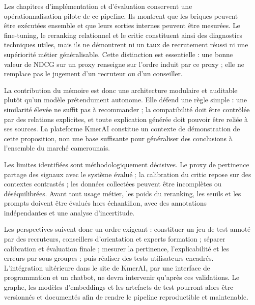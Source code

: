 \documentclass[12pt,twoside]{report}
\begin{document}
Les chapitres d'implémentation et d'évaluation conservent une opérationnalisation pilote de ce pipeline. Ils montrent que les briques peuvent être exécutées ensemble et que leurs sorties internes peuvent être mesurées. Le fine-tuning, le reranking relationnel et le critic constituent ainsi des diagnostics techniques utiles, mais ils ne démontrent ni un taux de recrutement réussi ni une supériorité métier généralisable. Cette distinction est essentielle : une bonne valeur de NDCG sur un proxy renseigne sur l'ordre induit par ce proxy ; elle ne remplace pas le jugement d'un recruteur ou d'un conseiller.

La contribution du mémoire est donc une architecture modulaire et auditable plutôt qu'un modèle prétendument autonome. Elle défend une règle simple : une similarité élevée ne suffit pas à recommander ; la compatibilité doit être contrôlée par des relations explicites, et toute explication générée doit pouvoir être reliée à ses sources. La plateforme KmerAI constitue un contexte de démonstration de cette proposition, non une base suffisante pour généraliser des conclusions à l'ensemble du marché camerounais.

Les limites identifiées sont méthodologiquement décisives. Le proxy de pertinence partage des signaux avec le système évalué ; la calibration du critic repose sur des contextes contrastés ; les données collectées peuvent être incomplètes ou déséquilibrées. Avant tout usage métier, les poids du reranking, les seuils et les prompts doivent être évalués hors échantillon, avec des annotations indépendantes et une analyse d'incertitude.

Les perspectives suivent donc un ordre exigeant : constituer un jeu de test annoté par des recruteurs, conseillers d'orientation et experts formation ; séparer calibration et évaluation finale ; mesurer la pertinence, l'explicabilité et les erreurs par sous-groupes ; puis réaliser des tests utilisateurs encadrés. L'intégration ultérieure dans le site de KmerAI, par une interface de programmation et un chatbot, ne devra intervenir qu'après ces validations. Le graphe, les modèles d'embeddings et les artefacts de test pourront alors être versionnés et documentés afin de rendre le pipeline reproductible et maintenable.



\appendix
{}
\end{document}
